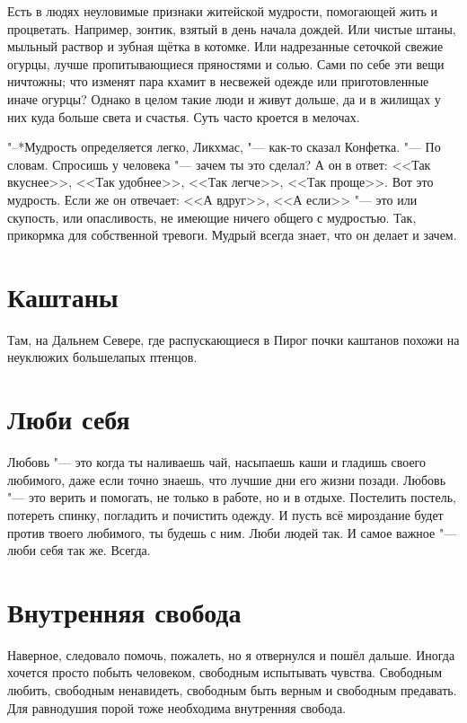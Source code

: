 \documentclass[a4paper,10pt]{book}
\begin{document}
 Есть в людях неуловимые признаки житейской мудрости, помогающей жить и 
процветать. Например, зонтик, взятый в день начала дождей. Или чистые штаны, 
мыльный раствор и зубная щётка в котомке. Или надрезанные сеточкой свежие 
огурцы, лучше пропитывающиеся пряностями и солью. Сами по себе эти вещи 
ничтожны; что изменят пара кхамит в несвежей одежде или приготовленные иначе 
огурцы? Однако в целом такие люди и живут дольше, да и в жилищах у них куда 
больше света и счастья. Суть часто кроется в мелочах.

"--*Мудрость определяется легко, Ликхмас, "--- как-то сказал Конфетка. "--- По 
словам. Спросишь у человека "--- зачем ты это сделал? А он в ответ: <<Так 
вкуснее>>, <<Так удобнее>>, <<Так легче>>, <<Так проще>>. Вот это мудрость. 
Если 
же он отвечает: <<А вдруг>>, <<А если>> "--- это или скупость, или опасливость, 
не имеющие ничего общего с мудростью. Так, прикормка для собственной тревоги. 
Мудрый всегда знает, что он делает и зачем.
 
 \section{Каштаны}

 Там, на Дальнем Севере, где распускающиеся в Пирог почки каштанов похожи на 
неуклюжих большелапых птенцов.
 
\section{Люби себя}
 
Любовь "--- это когда ты наливаешь чай, насыпаешь каши и гладишь своего 
любимого, даже если точно знаешь, что лучшие дни его жизни позади.
Любовь "--- это верить и помогать, не только в работе, но и в отдыхе. Постелить 
постель, потереть спинку, погладить и почистить одежду. И пусть всё мироздание 
будет против твоего любимого, ты будешь с ним. Люби людей так. И самое важное 
"--- люби себя так же. Всегда.
 
 \section{Внутренняя свобода}

  Наверное, следовало помочь, пожалеть, но я отвернулся и пошёл дальше. Иногда 
хочется просто побыть человеком, свободным испытывать чувства. Свободным 
любить, 
свободным ненавидеть, свободным быть верным и свободным предавать. Для 
равнодушия порой тоже необходима внутренняя свобода.
 
\end{document}
